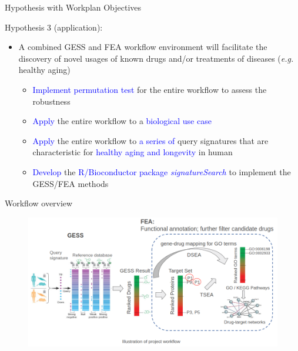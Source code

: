 \documentclass[10pt]{beamer}
\begin{document}
\begin{frame}{Hypothesis with Workplan Objectives}
\vspace{-1cm}
    \begin{alertblock}{Hypothesis 3 (application):}
    	\begin{itemize}
            \item \alert{A combined GESS and FEA workflow environment will facilitate the discovery of novel usages of known drugs and/or treatments of diseases (\textit{e.g.} healthy aging)}
            \begin{itemize}
                \item \textcolor{blue}{Implement permutation test} for the entire workflow to assess the robustness
                \item \textcolor{blue}{Apply} the entire workflow to a \textcolor{blue}{biological use case}
                \item \textcolor{blue}{Apply} the entire workflow to \textcolor{blue}{a series of} query signatures that are characteristic for \textcolor{blue}{healthy aging and longevity} in human
                \item \textcolor{blue}{Develop} the \textcolor{blue}{R/Bioconductor package \emph{signatureSearch}} to implement the GESS/FEA methods
            \end{itemize}
    	\end{itemize}
    \end{alertblock}
\end{frame}    
\begin{frame}{Workflow overview}
  \begin{figure}
      \includegraphics[width=12cm]{demo/images/workflow.png}
  \end{figure}
\end{frame}
\end{document}
